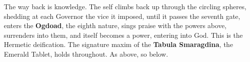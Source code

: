 The way back is knowledge. The self climbs back up through the circling spheres, shedding at each Governor the vice it imposed, until it passes the seventh gate, enters the \textbf{Ogdoad}, the eighth nature, sings praise with the powers above, surrenders into them, and itself becomes a power, entering into God. This is the Hermetic deification. The signature maxim of the \textbf{Tabula Smaragdina}, the Emerald Tablet, holds throughout. As above, so below.

